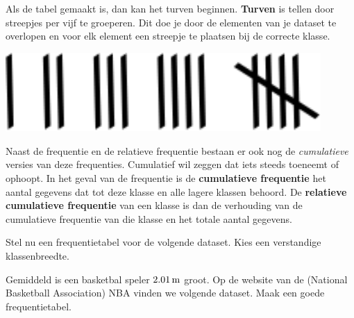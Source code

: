 \documentclass[12pt,twoside,a4paper]{article}
\begin{document}
\begin{minipage}{0.8\linewidth}
Als de tabel gemaakt is, dan kan het turven beginnen. {\bf Turven} is tellen door streepjes per vijf te groeperen. Dit doe je door de elementen van je dataset te overlopen en voor elk element een streepje te plaatsen bij de correcte klasse.
\end{minipage}
\begin{minipage}{0.2\linewidth}
\begin{center}
\includegraphics[width=0.9\textwidth]{turven}
\end{center}
\end{minipage}

Naast de frequentie en de relatieve frequentie bestaan er ook nog de {\it cumulatieve} versies van deze frequenties. Cumulatief wil zeggen dat iets steeds toeneemt of ophoopt. In het geval van de frequentie is de {\bf cumulatieve frequentie} het aantal gegevens dat tot deze klasse en alle lagere klassen behoord. De {\bf relatieve cumulatieve frequentie} van een klasse is dan de verhouding van de cumulatieve frequentie van die klasse en het totale aantal gegevens.

\begin{oefening}
  Stel nu een frequentietabel voor de volgende dataset. Kies een verstandige klassenbreedte.
\end{oefening}

\begin{oefening}
  Gemiddeld is een basketbal speler $2.01 \m$ groot. Op de website van de (National Basketball Association) NBA vinden we volgende dataset.
  Maak een goede frequentietabel.
\end{oefening}
\end{document}
